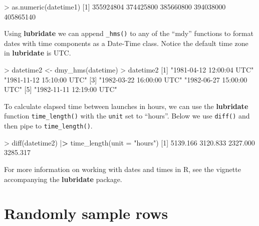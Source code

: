 \documentclass[
]{book}
\newenvironment{Shaded}{\begin{snugshade}}{\end{snugshade}}
\newcommand{\AttributeTok}[1]{\textcolor[rgb]{0.77,0.63,0.00}{#1}}
\newcommand{\DecValTok}[1]{\textcolor[rgb]{0.00,0.00,0.81}{#1}}
\newcommand{\ErrorTok}[1]{\textcolor[rgb]{0.64,0.00,0.00}{\textbf{#1}}}
\newcommand{\FloatTok}[1]{\textcolor[rgb]{0.00,0.00,0.81}{#1}}
\newcommand{\FunctionTok}[1]{\textcolor[rgb]{0.00,0.00,0.00}{#1}}
\newcommand{\NormalTok}[1]{#1}
\newcommand{\OtherTok}[1]{\textcolor[rgb]{0.56,0.35,0.01}{#1}}
\newcommand{\SpecialCharTok}[1]{\textcolor[rgb]{0.00,0.00,0.00}{#1}}
\newcommand{\StringTok}[1]{\textcolor[rgb]{0.31,0.60,0.02}{#1}}
\begin{document}
\begin{Shaded}
\begin{Highlighting}[]
\SpecialCharTok{\textgreater{}} \FunctionTok{as.numeric}\NormalTok{(datetime1)}
\NormalTok{[}\DecValTok{1}\NormalTok{] }\DecValTok{355924804} \DecValTok{374425800} \DecValTok{385660800} \DecValTok{394038000} \DecValTok{405865140}
\end{Highlighting}
\end{Shaded}

Using \textbf{lubridate} we can append \texttt{\_hms()} to any of the ``mdy'' functions to format dates with time components as a Date-Time class. Notice the default time zone in \textbf{lubridate} is UTC.

\begin{Shaded}
\begin{Highlighting}[]
\SpecialCharTok{\textgreater{}}\NormalTok{ datetime2 }\OtherTok{\textless{}{-}} \FunctionTok{dmy\_hms}\NormalTok{(datetime)}
\SpecialCharTok{\textgreater{}}\NormalTok{ datetime2}
\NormalTok{[}\DecValTok{1}\NormalTok{] }\StringTok{"1981{-}04{-}12 12:00:04 UTC"} \StringTok{"1981{-}11{-}12 15:10:00 UTC"}
\NormalTok{[}\DecValTok{3}\NormalTok{] }\StringTok{"1982{-}03{-}22 16:00:00 UTC"} \StringTok{"1982{-}06{-}27 15:00:00 UTC"}
\NormalTok{[}\DecValTok{5}\NormalTok{] }\StringTok{"1982{-}11{-}11 12:19:00 UTC"}
\end{Highlighting}
\end{Shaded}

To calculate elapsed time between launches in hours, we can use the \textbf{lubridate} function \texttt{time\_length()} with the \texttt{unit} set to ``hours''. Below we use \texttt{diff()} and then pipe to \texttt{time\_length()}.

\begin{Shaded}
\begin{Highlighting}[]
\SpecialCharTok{\textgreater{}} \FunctionTok{diff}\NormalTok{(datetime2) }\SpecialCharTok{|}\ErrorTok{\textgreater{}} \FunctionTok{time\_length}\NormalTok{(}\AttributeTok{unit =} \StringTok{"hours"}\NormalTok{)}
\NormalTok{[}\DecValTok{1}\NormalTok{] }\FloatTok{5139.166} \FloatTok{3120.833} \FloatTok{2327.000} \FloatTok{3285.317}
\end{Highlighting}
\end{Shaded}

For more information on working with dates and times in R, see the vignette accompanying the \textbf{lubridate} package.

\hypertarget{randomly-sample-rows}{%
\section{Randomly sample rows}\label{randomly-sample-rows}}
\end{document}
